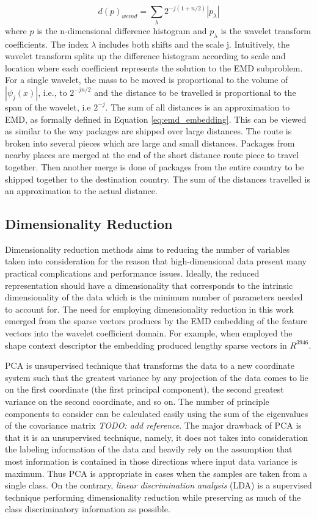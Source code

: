 \documentclass[10pt, conference, compsocconf]{IEEEtran}
\begin{document}
\begin{equation}
d(p)_{wemd}= \sum\limits_{\lambda} 2^{-j(1+n/2)}|p_{\lambda}|
\label{eq:emd_embedding}
\end{equation}
where $p$ is the n-dimensional difference histogram and $p_{\lambda}$ is the wavelet transform coefficients. 
The index $\lambda$ includes both shifts and the scale j.
Intuitively, the wavelet transform splits up the difference histogram according to scale and location where each coefficient represents the solution to the EMD subproblem. 
For a single wavelet, the mass to be moved is proportional to the volume of $|\psi_j(x)|$, i.e., to $2^{-jn/2}$ and the distance to be travelled is proportional to the span of the wavelet, i.e $2^{-j}$. The sum of all distances is an approximation to EMD, as formally defined in Equation \ref{eq:emd_embedding}. 
This can be viewed as similar to the way packages are shipped over large distances. 
The route is broken into several pieces which are large and small distances. 
Packages from nearby places are merged at the end of the short distance route piece to travel together. 
Then another merge is done of packages from the entire country to be shipped together to the destination country. 
The sum of the distances travelled is an approximation to the actual distance.

\subsection{Dimensionality Reduction}
Dimensionality reduction methods aims to reducing the number of variables taken into consideration for the reason that high-dimensional data present many practical complications and performance issues. 
Ideally, the reduced representation should have a dimensionality that corresponds to the intrinsic dimensionality of the data \cite{van2009dimensionality} which is the minimum number of parameters needed to account for.
The need for employing dimensionality reduction in this work emerged from the sparse vectors produces by the EMD embedding of the feature vectors into the wavelet coefficient domain.
For example, when employed the shape context descriptor the embedding produced lengthy sparse vectors in $R^{3946}$. 

PCA is unsupervised technique that transforms the data to a new coordinate system such that the greatest variance by any projection of the data comes to lie on the first coordinate (the first principal component), the second greatest variance on the second coordinate, and so on.
The number of principle components to consider can be calculated easily using the sum of the eigenvalues of the covariance matrix \emph{TODO: add reference}.
The major drawback of PCA is that it is an unsupervised technique, namely, it does not takes into consideration the labeling information of the data and heavily rely on the assumption that most information is contained in those directions where input data variance is maximum.
Thus PCA is appropriate in cases when the samples are taken from a single class.
On the contrary, \emph{linear discrimination analysis} (LDA) \cite{fisher1936use} is a supervised technique performing dimensionality reduction while preserving as much of the class discriminatory information as possible. 
\end{document}
